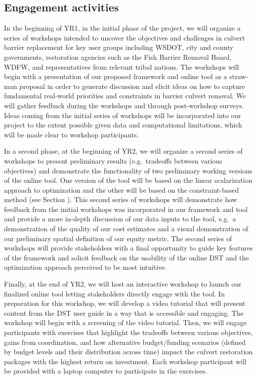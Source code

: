 \documentclass[12pt]{elsarticle}
\begin{document}
\subsection{Engagement activities}

In the beginning of YR1, in the initial phase of the project, we will organize a series of workshops intended to uncover the objectives and challenges in culvert barrier replacement for key user groups including WSDOT, city and county governments, restoration agencies such as the Fish Barrier Removal Board, WDFW, and representatives from relevant tribal nations. The workshops will begin with a presentation of our proposed framework and online tool as a straw-man proposal in order to generate discussion and elicit ideas on how to capture fundamental real-world priorities and constraints in barrier culvert removal. We will gather feedback during the workshops and through post-workshop surveys. Ideas coming from the initial series of workshops will be incorporated into our project to the extent possible given data and computational limitations, which will be made clear to workshop participants.

In a second phase, at the beginning of YR2, we will organize a second series of workshops to present preliminary results (e.g.\ tradeoffs between various objectives) and demonstrate the functionality of two preliminary working versions of the online tool. One version of the tool will be based on the linear scalarization approach to optimization and the other will be based on the constraint-based method (see Section \label{sec:opt}). This second series of workshops will demonstrate how feedback from the initial workshops was incorporated in our framework and tool and provide a more in-depth discussion of our data inputs to the tool, e.g.\ a demonstration of the quality of our cost estimates and a visual demonstration of our preliminary spatial definition of our equity metric. The second series of workshops will provide stakeholders with a final opportunity to guide key features of the framework and solicit feedback on the usability of the online DST and the optimization approach perceived to be most intuitive. 

Finally, at the end of YR2, we will host an interactive workshop to launch our finalized online tool letting stakeholders directly engage with the tool. In preparation for this workshop, we will develop a video tutorial that will present content from the DST user guide in a way that is accessible and engaging. The workshop will begin with a screening of the video tutorial. Then, we will engage participants with exercises that highlight the tradeoffs between various objectives, gains from coordination, and how alternative budget/funding scenarios (defined by budget levels and their distribution across time) impact the culvert restoration packages with the highest return on investment. Each workshop participant will be provided with a laptop computer to participate in the exercises. 
\end{document}
